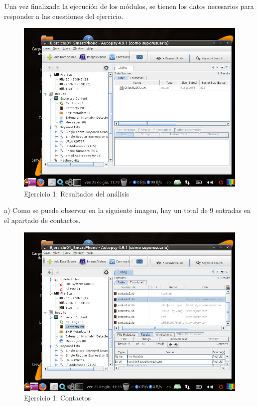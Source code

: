 \documentclass[11pt]{article}
\begin{document}
Una vez finalizada la ejecución de los módulos, se tienen los datos necesarios para responder a las cuestiones del ejercicio.

\begin{figure}[H]
    \caption{Ejercicio 1: Resultados del análisis}
    \centering
    \includegraphics[scale=0.7]{e1-5.png}
\end{figure}

a) Como se puede observar en la siguiente imagen, hay un total de 9 entradas en el apartado de contactos.

\begin{figure}[H]
    \caption{Ejercicio 1: Contactos}
    \centering
    \includegraphics[scale=0.7]{e1-6.png}
\end{figure}
\end{document}

